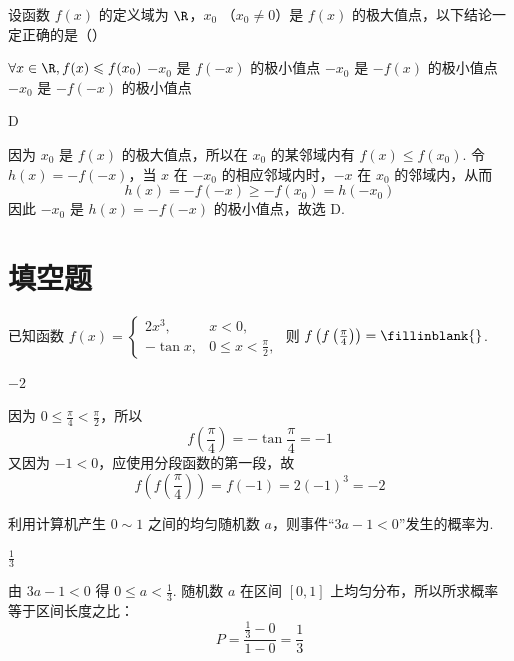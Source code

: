 \begin{problem}
设函数 \( f(x) \) 的定义域为 \(\R\)，\(x_0 \) （\(x_0 \neq 0\)）是 \( f(x) \) 的极大值点，以下结论一定正确的是（\quad）

\choices
    {\(\forall x\in \R,f(x)\leqslant f(x_0)\)}
    {\(-x_0\) 是 \(f(-x)\) 的极小值点}
    {\(-x_0\) 是 \(-f(x)\) 的极小值点}
    {\(-x_0\) 是 \(-f(-x)\) 的极小值点}
\begin{answer}
D
\end{answer}

\begin{solution}
因为 \(x_0\) 是 \(f(x)\) 的极大值点，所以在 \(x_0\) 的某邻域内有 \(f(x)\leqslant f(x_0)\). 令 \(h(x)=-f(-x)\)，当 \(x\) 在 \(-x_0\) 的相应邻域内时，\(-x\) 在 \(x_0\) 的邻域内，从而
\[
h(x)=-f(-x)\geqslant-f(x_0)=h(-x_0)
\]
因此 \(-x_0\) 是 \(h(x)=-f(-x)\) 的极小值点，故选 D.
\end{solution}
\end{problem}

\section{填空题}

\begin{problem}
已知函数 \(f(x) = \begin{cases}
2x^{3}, & x < 0,\\
-\tan x, & 0 \leqslant x < \frac{\pi}{2},
\end{cases}\) 则 \(f\left(f\left(\frac{\pi}{4}\right)\right)=\fillinblank{}\).

\begin{answer}
\(-2\)
\end{answer}

\begin{solution}
因为 \(0\leqslant\frac\pi4<\frac\pi2\)，所以
\[
f\left(\frac\pi4\right)=-\tan\frac\pi4=-1
\]
又因为 \(-1<0\)，应使用分段函数的第一段，故
\[
f\left(f\left(\frac\pi4\right)\right)=f(-1)=2(-1)^3=-2
\]
\end{solution}
\end{problem}

\begin{problem}
利用计算机产生 \(0 \sim 1\) 之间的均匀随机数 \(a\)，则事件“\(3a - 1 < 0\)”发生的概率为\fillinblank{}.

\begin{answer}
\(\frac{1}{3}\)
\end{answer}

\begin{solution}
由 \(3a-1<0\) 得 \(0\leqslant a<\frac13\). 随机数 \(a\) 在区间 \([0,1]\) 上均匀分布，所以所求概率等于区间长度之比：
\[
P=\frac{\frac13-0}{1-0}=\frac13
\]
\end{solution}
\end{problem}

